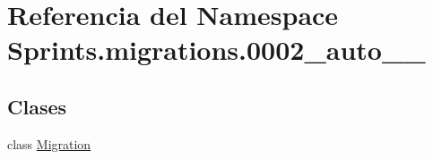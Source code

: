 \hypertarget{namespace_sprints_1_1migrations_1_10002__auto__20160610__1357}{}\section{Referencia del Namespace Sprints.\+migrations.0002\+\_\+auto\+\_\+\_}
\label{namespace_sprints_1_1migrations_1_10002__auto__20160610__1357}
\subsection*{Clases}
\begin{DoxyCompactItemize}
\item 
class \hyperlink{class_sprints_1_1migrations_1_10002__auto__20160610__1357_1_1_migration}{Migration}
\end{DoxyCompactItemize}
